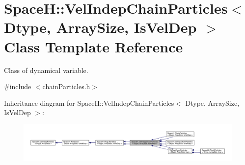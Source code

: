 \hypertarget{class_space_h_1_1_vel_indep_chain_particles}{}\section{SpaceH\+:\+:Vel\+Indep\+Chain\+Particles$<$ Dtype, Array\+Size, Is\+Vel\+Dep $>$ Class Template Reference}
\label{class_space_h_1_1_vel_indep_chain_particles}


Class of dynamical variable.  




{\ttfamily \#include $<$chain\+Particles.\+h$>$}



Inheritance diagram for SpaceH\+:\+:Vel\+Indep\+Chain\+Particles$<$ Dtype, Array\+Size, Is\+Vel\+Dep $>$\+:
\nopagebreak
\begin{figure}[H]
\begin{center}
\leavevmode
\includegraphics[width=350pt]{class_space_h_1_1_vel_indep_chain_particles__inherit__graph}
\end{center}
\end{figure}


